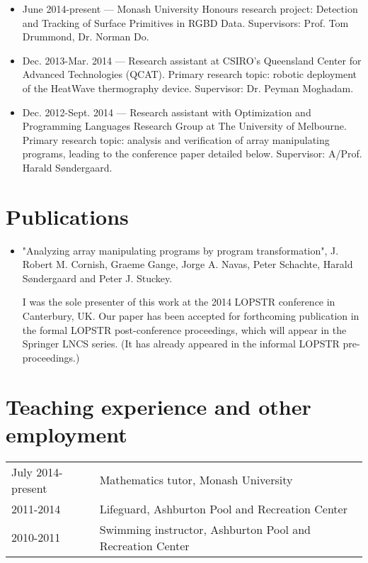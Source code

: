 \documentclass[12pt,a4paper]{article}
\newenvironment{llist}
  {\renewcommand{\arraystretch}{1.5}\begin{longtable}{p{3.5cm} p{12cm}}}
  {\end{longtable}}
\begin{document}
\begin{itemize}
  \item June 2014-present --- Monash University Honours research project:
    Detection and Tracking of Surface Primitives in RGBD Data. Supervisors:
    Prof. Tom Drummond, Dr. Norman Do.

  \item Dec. 2013-Mar. 2014 --- Research assistant at CSIRO's Queensland Center
    for Advanced Technologies (QCAT). Primary research topic: robotic
    deployment of the HeatWave thermography device. Supervisor: Dr. Peyman
    Moghadam.

  \item Dec. 2012-Sept. 2014 --- Research assistant with Optimization and
    Programming Languages Research Group at The University of Melbourne.
    Primary research topic: analysis and verification of array manipulating
    programs, leading to the conference paper detailed below. Supervisor:
    A/Prof. Harald S\o ndergaard.
\end{itemize}

\section*{Publications}

\begin{itemize}
  \item "Analyzing array manipulating programs by program transformation", J.
    Robert M.  Cornish, Graeme Gange, Jorge A. Navas, Peter Schachte, Harald
    S\o ndergaard and Peter J. Stuckey.
    
    I was the sole presenter of this work at the 2014 LOPSTR conference in
    Canterbury, UK. Our paper has been accepted for forthcoming publication in
    the formal LOPSTR post-conference proceedings, which will appear in the
    Springer LNCS series. (It has already appeared in the informal LOPSTR
    pre-proceedings.)
\end{itemize}

\section*{Teaching experience and other employment}
\begin{llist}
  July 2014-present & Mathematics tutor, Monash University \\
  2011-2014 & Lifeguard, Ashburton Pool and Recreation Center \\
  2010-2011 & Swimming instructor, Ashburton Pool and Recreation Center \\
\end{llist}
\end{document}
